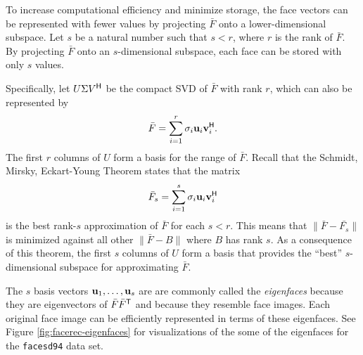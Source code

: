 To increase computational efficiency and minimize storage, the face vectors can be represented with fewer values by projecting $\bar{F}$ onto a lower-dimensional subspace.
Let $s$ be a natural number such that $s < r$, where $r$ is the rank of $\bar{F}$.
By projecting $\bar{F}$ onto an $s$-dimensional subspace, each face can be stored with only $s$ values.

Specifically, let $U \Sigma V^{\mathsf H}$ be the compact SVD of $\bar{F}$ with rank $r$, which can also be represented by
 \[
\bar{F}= \sum_{i=1}^r \sigma_i\mathbf{u}_i\mathbf{v}_i^{\mathsf H}.
\]
The first $r$ columns of $U$ form a basis for the range of $\bar{F}$.
Recall that the Schmidt, Mirsky, Eckart-Young Theorem states that the matrix
\[
\bar{F}_s = \sum_{i=1}^s \sigma_i\mathbf{u}_i\mathbf{v}_i^{\mathsf H}
\]
is the best rank-$s$ approximation of $\bar{F}$ for each $s < r$.
This means that $\| \bar{F} - \bar{F_s} \|$ is minimized against all other $\| \bar{F} - B \|$ where $B$ has rank $s$.
As a consequence of this theorem, the first $s$ columns of $U$ form a basis that provides the ``best'' $s$-dimensional subspace for approximating $\bar{F}$.

The $s$ basis vectors $\mathbf{u}_1, \ldots, \mathbf{u}_s$ are are commonly called the \emph{eigenfaces} because they are eigenvectors of $\bar{F}\bar{F}^{\mathsf T}$ and because they resemble face images.
Each original face image can be efficiently represented in terms of these eigenfaces.
See Figure \ref{fig:facerec-eigenfaces} for visualizations of the some of the eigenfaces for the \texttt{facesd94} data set.

